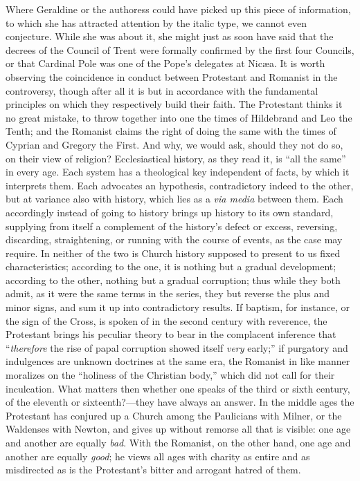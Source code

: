 Where Geraldine or the authoress could have picked
up this piece of information, to which she has attracted attention by
the italic type, we cannot even conjecture. While she was about it, she
might just as soon have said that the decrees of the Council of Trent
were formally confirmed by the first four Councils, or that Cardinal
Pole was one of the Pope's delegates at Nicæa. It is worth observing
the coincidence in conduct between Protestant and Romanist in the
controversy, though after all it is but in accordance with the
fundamental principles on which they respectively build their faith. The
Protestant thinks it no great mistake, to throw together into one the
times of Hildebrand and Leo the Tenth; and the Romanist claims the right
of doing the same with the times of Cyprian and Gregory the First. And
why, we would ask, should they not do so, on their view of religion?
Ecclesiastical history, as they read it, is ``all the same'' in every age.
Each system has a theological key independent of facts, by which it
interprets them. Each advocates an hypothesis, contradictory indeed to
the other, but at variance also with history, which lies as a \emph{via
media} between them. Each accordingly instead of going to history
brings up history to its own standard, supplying from itself a
complement of the history's defect or excess, reversing, discarding,
straightening, or running with the course of events, as the case may
require. In neither of the two is Church history supposed to present to
us fixed characteristics; according to the one, it is nothing but a
gradual development; according to the other, nothing but a gradual
corruption; thus while they both admit, as it were the same terms in the
series, they but reverse the plus and minor signs, and sum it up into
contradictory results. If baptism, for instance, or the sign of the
Cross, is spoken of in the second century with reverence, the Protestant
brings his peculiar theory to bear in the complacent inference that ``\emph{therefore}
the rise of papal corruption showed itself \emph{very} early;'' if
purgatory and indulgences are unknown doctrines at the same era, the
Romanist in like manner moralizes on the ``holiness of the Christian
body,'' which did not call for their inculcation. What matters then
whether one speaks of the third or sixth century, of the eleventh or
sixteenth?—they have always an answer. In the middle ages the
Protestant has conjured up a Church among the Paulicians with Milner, or
the Waldenses with Newton, and gives up without remorse all that is
visible: one age and another are equally \emph{bad}. With the Romanist,
on the other hand, one age and another are equally \emph{good}; he views
all ages with charity as entire and as misdirected as is the Protestant's
bitter and arrogant hatred of them.

